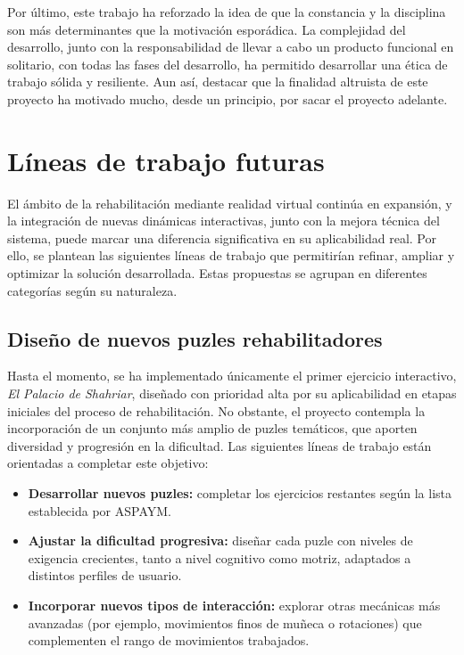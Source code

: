Por último, este trabajo ha reforzado la idea de que la constancia y la disciplina son más determinantes que la motivación esporádica. La complejidad del desarrollo, junto con la responsabilidad de llevar a cabo un producto funcional en solitario, con todas las fases del desarrollo, ha permitido desarrollar una ética de trabajo sólida y resiliente. Aun así, destacar que la finalidad altruista de este proyecto ha motivado mucho, desde un principio, por sacar el proyecto adelante.

\section{Líneas de trabajo futuras}

El ámbito de la rehabilitación mediante realidad virtual continúa en expansión, y la integración de nuevas dinámicas interactivas, junto con la mejora técnica del sistema, puede marcar una diferencia significativa en su aplicabilidad real. Por ello, se plantean las siguientes líneas de trabajo que permitirían refinar, ampliar y optimizar la solución desarrollada. Estas propuestas se agrupan en diferentes categorías según su naturaleza.

\subsection*{Diseño de nuevos puzles rehabilitadores}

Hasta el momento, se ha implementado únicamente el primer ejercicio interactivo, \textit{El Palacio de Shahriar}, diseñado con prioridad alta por su aplicabilidad en etapas iniciales del proceso de rehabilitación. No obstante, el proyecto contempla la incorporación de un conjunto más amplio de puzles temáticos, que aporten diversidad y progresión en la dificultad. Las siguientes líneas de trabajo están orientadas a completar este objetivo:

\begin{itemize}
    \item \textbf{Desarrollar nuevos puzles:} completar los ejercicios restantes según la lista establecida por ASPAYM.
    \item \textbf{Ajustar la dificultad progresiva:} diseñar cada puzle con niveles de exigencia crecientes, tanto a nivel cognitivo como motriz, adaptados a distintos perfiles de usuario.
    \item \textbf{Incorporar nuevos tipos de interacción:} explorar otras mecánicas más avanzadas (por ejemplo, movimientos finos de muñeca o rotaciones) que complementen el rango de movimientos trabajados.
\end{itemize}

